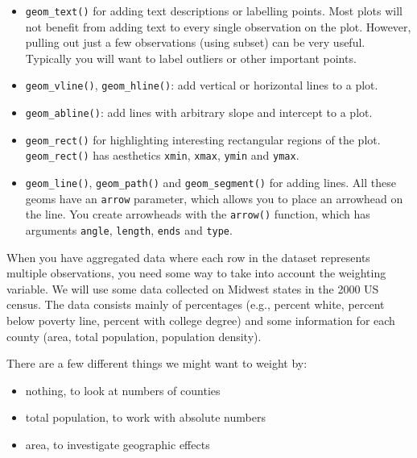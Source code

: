 \begin{itemize}
\itemsep1pt\parskip0pt
\item
  \texttt{geom\_text()} for adding text descriptions or labelling
  points. Most plots will not benefit from adding text to every single
  observation on the plot. However, pulling out just a few observations
  (using subset) can be very useful. Typically you will want to label
  outliers or other important points. 
\item
  \texttt{geom\_vline()}, \texttt{geom\_hline()}: add vertical or
  horizontal lines to a plot.  
\item
  \texttt{geom\_abline()}: add lines with arbitrary slope and intercept
  to a plot. 
\item
  \texttt{geom\_rect()} for highlighting interesting rectangular regions
  of the plot. \texttt{geom\_rect()} has aesthetics \texttt{xmin},
  \texttt{xmax}, \texttt{ymin} and \texttt{ymax}. 
\item
  \texttt{geom\_line()}, \texttt{geom\_path()} and
  \texttt{geom\_segment()} for adding lines. All these geoms have an
  \texttt{arrow} parameter, which allows you to place an arrowhead on
  the line. You create arrowheads with the \texttt{arrow()} function,
  which has arguments \texttt{angle}, \texttt{length}, \texttt{ends} and
  \texttt{type}. 
\end{itemize}


When you have aggregated data where each row in the dataset represents
multiple observations, you need some way to take into account the
weighting variable. We will use some data collected on Midwest states in
the 2000 US census. The data consists mainly of percentages (e.g.,
percent white, percent below poverty line, percent with college degree)
and some information for each county (area, total population, population
density). 

There are a few different things we might want to weight by:

\begin{itemize}
\itemsep1pt\parskip0pt
\item
  nothing, to look at numbers of counties
\item
  total population, to work with absolute numbers
\item
  area, to investigate geographic effects
\end{itemize}

